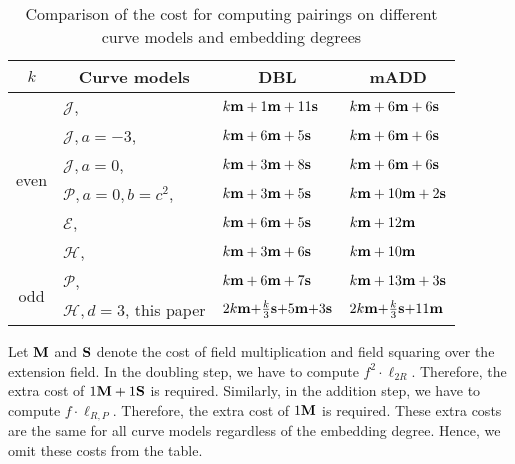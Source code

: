 \begin{table}[h]
\centering
\caption{Comparison of the cost for computing pairings on different curve models and embedding degrees}

\begin{tabular}{ l | l | l | l}
\hline
\multicolumn{1}{c|}{$k$}
&\multicolumn{1}{c|}{Curve models}	&\multicolumn{1}{c|}{DBL}	&\multicolumn{1}{c}{mADD}	\\
\hline
\multicolumn{1}{c|}{\multirow{6}{*}{even}}
&$\mathcal{J}$, \cite{2008/IonicaJoux08} \cite{2009/fastertate}
				&$k\textbf{m} + 1\textbf{m} + 11\textbf{s}	$	&$k\textbf{m} + 6\textbf{m} + 6\textbf{s}$	\\
&$\mathcal{J},a = -3$, \cite{2009/fastertate}
				&$k\textbf{m} + 6\textbf{m} + 5\textbf{s}$		&$k\textbf{m} + 6\textbf{m} + 6\textbf{s}$	\\
&$\mathcal{J},a = 0$, \cite{2009/fastertate}		
				&$k\textbf{m} + 3\textbf{m} + 8\textbf{s}$		&$k\textbf{m} + 6\textbf{m} + 6\textbf{s}$	\\
&$\mathcal{P},a = 0, b = c^2$, \cite{2009/craig}
				&$k\textbf{m} + 3\textbf{m} + 5\textbf{s}$		&$k\textbf{m} + 10\textbf{m} + 2\textbf{s}$	\\
&$\mathcal{E}$, \cite{2009/fastertate}			
				&$k\textbf{m} + 6\textbf{m} + 5\textbf{s}$		&$k\textbf{m} + 12\textbf{m}$	\\
&$\mathcal{H}$, \cite{2010/Gu}	&$k\textbf{m} + 3\textbf{m} + 6\textbf{s}$		&$k\textbf{m} + 10\textbf{m}$	\\
\hline
\multicolumn{1}{c|}{\multirow{2}{*}{odd}}
&$\mathcal{P}$, \cite{2010/CLN}	&$k\textbf{m} + 6\textbf{m} + 7\textbf{s}$		&$k\textbf{m} + 13\textbf{m} + 3\textbf{s}$	\\
&$\mathcal{H},d=3$, this paper
				&$2k\textbf{m} {+} \frac{k}{3}\textbf{s} {+} 5\textbf{m} {+} 3\textbf{s}$
									&$2k\textbf{m} {+} \frac{k}{3}\textbf{s} {+} 11\textbf{m}$	\\
\hline
\end{tabular}
\label{tbl-cmp}


\end{table}

Let $\textbf{M}$ and $\textbf{S}$ denote the cost of field multiplication and field squaring over the extension field.
In the doubling step,
we have to compute $f^2 \cdot \ell_{2R}$.
Therefore, the extra cost of $1\textbf{M} + 1\textbf{S}$ is required.
Similarly, in the addition step,
we have to compute $f \cdot \ell_{R,P}$.
Therefore, the extra cost of $1\textbf{M}$ is required.
These extra costs are the same for all curve models regardless of the embedding degree.
Hence, we omit these costs from the table.

